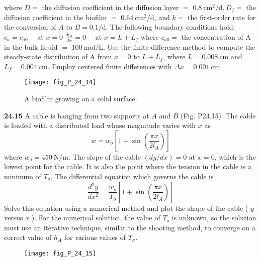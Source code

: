 \documentclass[../main.tex]{subfiles}
\begin{document}
\begin{multicols}{2}
    \noindent where $D=$ the diffusion coefficient in the diffusion layer $=$ $0.8 \mathrm{~cm}^{2} / \mathrm{d}, D_{f}=$ the diffusion coefficient in the biofilm $=$ $0.64 \mathrm{~cm}^{2} / \mathrm{d}$, and $k=$ the first-order rate for the conversion of $A$ to $B=0.1 / \mathrm{d}$. The following boundary conditions hold: $c_{a}=c_{a 0} \quad$ at $x=0$ $\frac{d c_{a}}{d x}=0 \quad$ at $x=L+L_{f}$
    where $c_{a 0}=$ the concentration of $\mathrm{A}$ in the bulk liquid $=$ $100 \mathrm{~mol} / \mathrm{L}$. Use the finite-difference method to compute the steady-state distribution of A from $x=0$ to $L+L_{f}$, where $L=0.008 \mathrm{~cm}$ and $L_{f}=0.004 \mathrm{~cm}$. Employ centered finite differences with $\Delta x=0.001 \mathrm{~cm}$.

    \begin{figure}[H]
        \centering
        \texttt{[image: fig\_P\_24\_14]}
        \caption{\textsf{A biofilm growing on a solid surface.}}
       \label{fig:fig_P_24_14} %
    \end{figure}\vspace{2mm}

    \noindent\textbf{24.15} A cable is hanging from two supports at $A$ and $B$ (Fig. P24.15). The cable is loaded with a distributed load whose magnitude varies with $x$ as
    $$
    w=w_{o}\left[1+\sin \left(\frac{\pi x}{2 l_{A}}\right)\right]
    $$
    where $w_{o}=450 \mathrm{~N} / \mathrm{m}$. The slope of the cable $(d y / d x)=0$ at $x=0$, which is the lowest point for the cable. It is also the point where the tension in the cable is a minimum of $T_{o}$. The differential equation which governs the cable is
    $$
    \frac{d^{2} y}{d x^{2}}=\frac{w_{o}}{T_{o}}\left[1+\sin \left(\frac{\pi x}{2 l_{A}}\right)\right]
    $$
    Solve this equation using a numerical method and plot the shape of the cable ( $y$ versus $x$ ). For the numerical solution, the value of $T_{o}$ is unknown, so the solution must use an iterative technique, similar to the shooting method, to converge on a correct value of $h_{A}$ for various values of $T_{\sigma}$.

    \begin{figure}[H]
        \centering
        \texttt{[image: fig\_P\_24\_15]}
        \caption{}
       \label{fig:fig_P_24_15} %
    \end{figure}\vspace{2mm}


\end{multicols}
\end{document}
